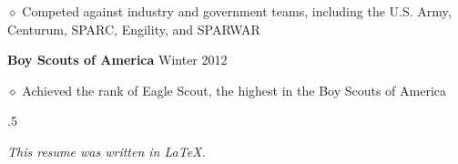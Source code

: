 \documentclass[executivepaper]{extarticle}
\begin{document}
\begin{center}
{\begin{minipage}{7.0in}
\vspace{0.25mm}

{\noindent $\diamond$ {\fontsize{12}{8}\selectfont Competed against industry and government teams, including the U.S. Army, Centurum, SPARC, Engility, and SPARWAR}}

\vspace{2mm}

{\noindent \textbf{\fontsize{12}{8}\selectfont Boy Scouts of America}} {\hfill \fontsize{10}{8}\selectfont Winter 2012}

\vspace{0.25mm}

{\noindent $\diamond$ {\fontsize{12}{8}\selectfont Achieved the rank of Eagle Scout, the highest in the Boy Scouts of America}}

\vspace{5mm}



\moveleft.5\hoffset\centerline{{\small\sl This resume was written in \LaTeX.}}

\end{minipage}

}

\end{center}
\end{document}
